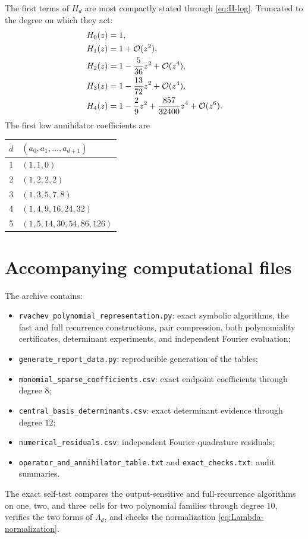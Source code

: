 \documentclass[11pt,oneside]{article}
\theoremstyle{definition}
\theoremstyle{remark}
\newcommand{\bigO}{\mathcal O}
\newcommand{\file}[1]{\nolinkurl{#1}}
\begin{document}
The first terms of $H_d$ are most compactly stated through \eqref{eq:H-log}.  Truncated to the degree on which they act:
\begin{align}
 H_0(z)&=1,\notag\\
 H_1(z)&=1+\bigO(z^2),\notag\\
 H_2(z)&=1-\frac{5}{36}z^2+\bigO(z^4),\notag\\
 H_3(z)&=1-\frac{13}{72}z^2+\bigO(z^4),\notag\\
 H_4(z)&=1-\frac{2}{9}z^2+\frac{857}{32400}z^4+\bigO(z^6).
                                                                    \label{eq:H-low}
\end{align}
The first low annihilator coefficients are
\begin{center}
\begin{tabular}{c l}
\toprule
$d$ & $(a_0,a_1,\ldots,a_{d+1})$\\
\midrule
1 & $(1,1,0)$\\
2 & $(1,2,2,2)$\\
3 & $(1,3,5,7,8)$\\
4 & $(1,4,9,16,24,32)$\\
5 & $(1,5,14,30,54,86,126)$\\
\bottomrule
\end{tabular}
\end{center}

\section{Accompanying computational files}

The archive contains:
\begin{itemize}
\item \file{rvachev_polynomial_representation.py}: exact symbolic algorithms, the fast and full recurrence constructions, pair compression, both polynomiality certificates, determinant experiments, and independent Fourier evaluation;
\item \file{generate_report_data.py}: reproducible generation of the tables;
\item \file{monomial_sparse_coefficients.csv}: exact endpoint coefficients through degree $8$;
\item \file{central_basis_determinants.csv}: exact determinant evidence through degree $12$;
\item \file{numerical_residuals.csv}: independent Fourier-quadrature residuals;
\item \file{operator_and_annihilator_table.txt} and \file{exact_checks.txt}: audit summaries.
\end{itemize}
The exact self-test compares the output-sensitive and full-recurrence algorithms on one, two, and three cells for two polynomial families through degree $10$, verifies the two forms of $\Lambda_d$, and checks the normalization \eqref{eq:Lambda-normalization}.
\end{document}
